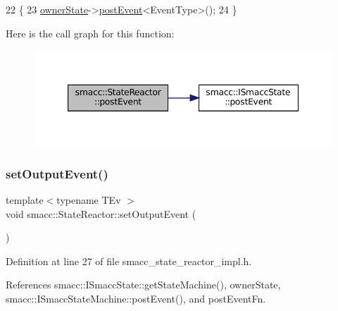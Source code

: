 \begin{DoxyCode}
22 \{
23     \hyperlink{classsmacc_1_1StateReactor_aabd30af9412a8fea9ec5906f173d9d4a}{ownerState}->\hyperlink{classsmacc_1_1ISmaccState_acef404ab3766ddf2892e8dad14a4a7cf}{postEvent}<EventType>();
24 \}
\end{DoxyCode}
Here is the call graph for this function\+:
\nopagebreak
\begin{figure}[H]
\begin{center}
\leavevmode
\includegraphics[width=347pt]{classsmacc_1_1StateReactor_a3d149851c5540110a29e9a7b3228239d_cgraph}
\end{center}
\end{figure}
\mbox{\label{classsmacc_1_1StateReactor_ae9d0dd0c8cdcc57f8881f0962040c8ed}} 
\subsubsection{\texorpdfstring{set\+Output\+Event()}{setOutputEvent()}}
{\footnotesize\ttfamily template$<$typename T\+Ev $>$ \\
void smacc\+::\+State\+Reactor\+::set\+Output\+Event (\begin{DoxyParamCaption}{ }\end{DoxyParamCaption})}



Definition at line 27 of file smacc\+\_\+state\+\_\+reactor\+\_\+impl.\+h.



References smacc\+::\+I\+Smacc\+State\+::get\+State\+Machine(), owner\+State, smacc\+::\+I\+Smacc\+State\+Machine\+::post\+Event(), and post\+Event\+Fn.


